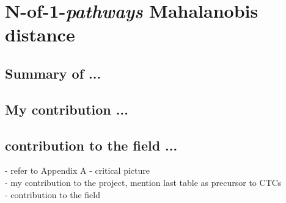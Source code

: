 \chapter{N-of-1-\emph{pathways} Mahalanobis distance} \label{Chap:md}


\section{Summary of ...} \label{sec:mdsummary}

\section{My contribution ...} \label{sec:mdstudent}

\section{contribution to the field ...} \label{sec:mdcontr}

- refer to Appendix A
- critical picture\\
- my contribution to the project, mention last table as precursor to CTCs\\ 
- contribution to the field\\

